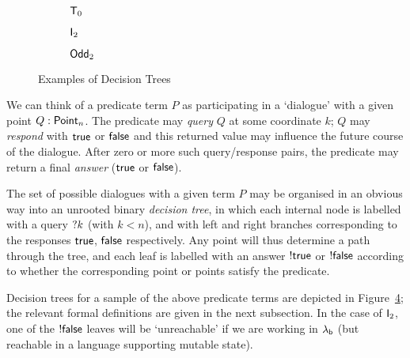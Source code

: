 \documentclass[12pt,phd,lfcs,twoside,openright,logo,leftchapter,normalheadings]{infthesis}
\theoremstyle{plain}
\theoremstyle{definition}
\begin{document}
\begin{figure}
  \centering
  \begin{subfigure}{0.1\textwidth}
    \begin{center}
    \vspace*{6.5ex}
    \scalebox{1.0}{\TTZeroModel}
    \vspace*{6.5ex}
    \end{center}
    \caption{$\mathsf{T}_0$}
    \label{fig:tt0-tree}
  \end{subfigure}
  \begin{subfigure}{0.3\textwidth}
    \begin{center}
    \scalebox{1.0}{\ShortConjModel}
    \end{center}
    \caption{$\mathsf{I}_2$}
    \label{fig:div1-tree}
  \end{subfigure}
  \begin{subfigure}{0.4\textwidth}
    \begin{center}
    \scalebox{1.0}{\XORTwoModel}
    \end{center}
    \caption{$\mathsf{Odd}_2$}
    \label{fig:xor2-tree}
  \end{subfigure}
  \caption{Examples of Decision Trees}
  \label{fig:example-models}
\end{figure}

We can think of a predicate term $P$ as participating in a `dialogue'
with a given point $Q : \mathsf{Point}_n$.
The predicate may \emph{query} $Q$ at some coordinate $k$;
$Q$ may \emph{respond} with $\mathsf{true}$ or $\mathsf{false}$ and this returned value
may influence the future course of the dialogue.
After zero or more such query/response pairs, the predicate may return a
final \emph{answer} ($\mathsf{true}$ or $\mathsf{false}$).

The set of possible dialogues with a given term $P$ may be organised
in an obvious way into an unrooted binary \emph{decision tree}, in
which each internal node is labelled with a query $\mathord{?} k$ (with
$k<n$), and with left and right branches corresponding to the
responses $\mathsf{true}$, $\mathsf{false}$ respectively.  Any point will thus
determine a path through the tree, and each leaf is labelled with an
answer $\mathord{!} \mathsf{true}$ or $\mathord{!} \mathsf{false}$ according to whether the
corresponding point or points satisfy the predicate.

Decision trees for a sample of the above predicate terms are depicted
in Figure~\ref{fig:example-models}; the relevant formal definitions
are given in the next subsection.  In the case of $\mathsf{I}_2$, one of
the $\mathord{!} \mathsf{false}$ leaves will be `unreachable' if we are working in
$\lambda_{\mathsf{b}}$ (but reachable in a language supporting mutable state).
\end{document}
